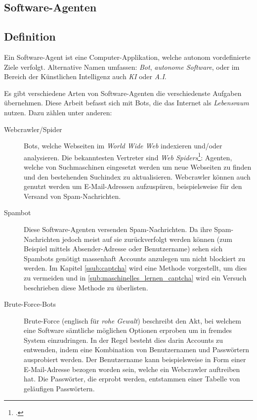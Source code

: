 \subsection{Software-Agenten} %
\label{sub:software_agenten}
\subsection{Definition} %
\label{sub:software-agent_definition}
Ein Software-Agent ist eine Computer-Applikation, welche autonom vordefinierte
Ziele verfolgt. Alternative Namen umfassen: \emph{Bot}, \emph{autonome
Software}, oder im Bereich der Künstlichen Intelligenz auch \emph{KI} oder
\emph{A.I}.

Es gibt verschiedene Arten von Software-Agenten die verschiedenste Aufgaben
übernehmen. Diese Arbeit befasst sich mit Bots, die das Internet als
\emph{Lebensraum} nutzen. Dazu zählen unter anderen:

\begin{description}
  \item[Webcrawler/Spider]
  Bots, welche Webseiten im \emph{World Wide Web} indexieren und/oder
  analysieren. Die bekanntesten Vertreter sind \emph{Web
  Spiders}\footcite{wa:tkWWWRobot}: Agenten, welche von Suchmaschinen eingesetzt
  werden um neue Webseiten zu finden und den bestehenden Suchindex zu
  aktualisieren. Webcrawler können auch genutzt werden um E-Mail-Adressen
  aufzuspüren, beispielsweise für den Versand von Spam-Nachrichten.
  
  \item[Spambot]
  Diese Software-Agenten versenden Spam-Nachrichten. Da ihre Spam-Nachrichten
  jedoch meist auf sie zurückverfolgt werden können (zum Beispiel mittels
  Absender-Adresse oder Benutzername) sehen sich Spambots genötigt massenhaft
  Accounts anzulegen um nicht blockiert zu werden. Im Kapitel
  \ref{ssub:captcha} wird eine Methode vorgestellt, um dies zu vermeiden und in
  \ref{sub:maschinelles_lernen_captcha} wird ein Versuch beschrieben diese
  Methode zu überlisten.
  
  \item[Brute-Force-Bots]
  Brute-Force (englisch für \emph{rohe Gewalt}) beschreibt den Akt, bei welchem
  eine Software sämtliche möglichen Optionen erproben um in fremdes System
  einzudringen. In der Regel besteht dies darin Accounts zu entwenden, indem
  eine Kombination von Benutzernamen und Passwörtern ausprobiert werden. Der
  Benutzername kann beispielsweise in Form einer E-Mail-Adresse bezogen worden
  sein, welche ein Webcrawler auftreiben hat. Die Passwörter, die erprobt
  werden, entstammen einer Tabelle von geläufigen Passwörtern.
\end{description}
